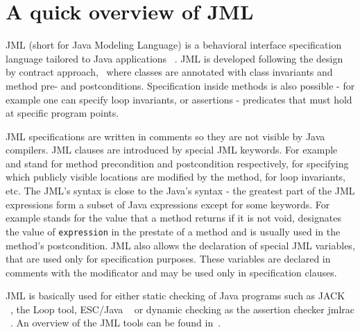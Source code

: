 \section{A quick overview of JML}\label{prelim}
JML (short for Java Modeling Language) is a behavioral interface specification language tailored to Java applications ~\cite{JMLRefMan}. JML is developed 
following the design by contract approach,~\cite{M97oos} where classes are annotated with class invariants and method pre- and postconditions. Specification
inside methods is also possible - for example one can specify loop invariants, or assertions - predicates that must hold at specific program points. 

JML specifications are written in comments so they are not visible by Java compilers. JML clauses are introduced by 
special JML keywords. For example  and  stand for method precondition and postcondition respectively,  for specifying which publicly visible locations are modified by the method,  for loop invariants, etc. The JML's syntax is close to the Java's syntax - the greatest part of the JML expressions form a subset of Java expressions except for some keywords. For example  stands for the value that a method returns if it is not void,  designates the value of \texttt{expression} in the prestate of a method and is usually used in the method's postcondition. JML also allows the declaration of special JML variables, that are used only for specification purposes. 
These variables are declared in comments with the  modificator and may be used only in specification clauses. 

JML is basically used for either static checking of Java programs such as JACK ~\cite{BR02jack}, the Loop tool, ESC/Java ~\cite{escjava} or dynamic checking as the assertion checker jmlrac ~\cite{jmlrac}. An overview of the JML tools can be found in~\cite{BurdyCCEKLLP03}.
     
